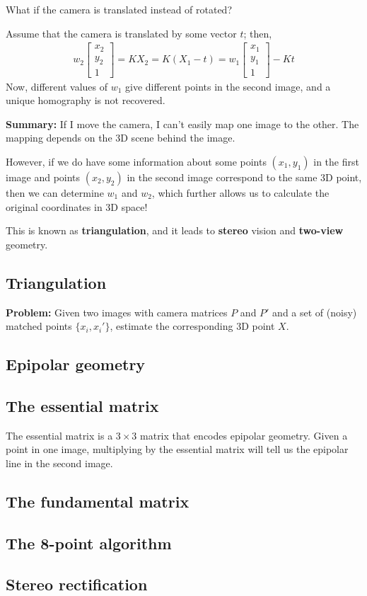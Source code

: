 \documentclass[11pt]{article}
\begin{document}
What if the camera is translated instead of rotated?

Assume that the camera is translated by some vector $t$; then,
\begin{align*}
    w_2 
    \begin{bmatrix}
        x_2 \\ y_2 \\ 1
    \end{bmatrix}
    = K X_2 = K (X_1 - t) = w_1 
    \begin{bmatrix}
        x_1 \\ y_1 \\ 1
    \end{bmatrix}  - Kt 
\end{align*}
Now, different values of $w_1$ give different points in the second image, and a unique homography is not recovered.

\textbf{Summary:} If I move the camera, I can't easily map one image to the other. The mapping depends on the 3D scene behind the image. 

However, if we do have some information about some points $(x_1,y_1)$ in the first image and points $(x_2, y_2)$ in the second image correspond to the same 3D point, then we can determine $w_1$ and $w_2$, which further allows us to calculate the original coordinates in 3D space! 

This is known as \textbf{triangulation}, and it leads to \textbf{stereo} vision and \textbf{two-view} geometry. 

\subsection{Triangulation}

\textbf{Problem:} Given two images with camera matrices $P$ and $P'$ and a set of (noisy) matched points $\{x_i, x_i' \}$, estimate the corresponding 3D point $X$. 


\subsection{Epipolar geometry}

\subsection{The essential matrix}
The essential matrix is a $3 \times 3$ matrix that encodes epipolar geometry. Given a point in one image, multiplying by the essential matrix will tell us the epipolar line in the second image. 

\subsection{The fundamental matrix}

\subsection{The 8-point algorithm}

\subsection{Stereo rectification}
\end{document}

